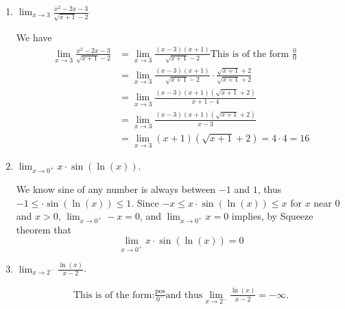 \documentclass[nooutcomes, handout]{ximera}
\begin{document}
\begin{problem}
	\begin{enumerate}
  \item
      $\displaystyle \lim_{x \to 3} \frac{x^2 - 2x - 3}{\sqrt{x+1} - 2}$
      \begin{freeResponse}
        We have
        \begin{align*}
          \lim_{x \to 3} \frac{x^2 - 2x - 3}{\sqrt{x+1} - 2} &= \lim_{x \to 3} \frac{(x- 3)(x + 1)}{\sqrt{x+1} - 2} \text{This is of the form $\frac{0}{0}$} \\
          &= \lim_{x \to 3} \frac{(x- 3)(x + 1)}{\sqrt{x+1} - 2} \cdot \frac{\sqrt{x+1} + 2}{\sqrt{x+1} + 2}\\
          &= \lim_{x \to 3} \frac{(x- 3)(x + 1)(\sqrt{x+1} + 2)}{x+1 - 4}\\
          &= \lim_{x \to 3} \frac{(x- 3)(x + 1)(\sqrt{x+1} + 2)}{x-3}\\
          &= \lim_{x \to 3} (x + 1)(\sqrt{x+1} + 2) = 4 \cdot 4 = 16
        \end{align*}
      \end{freeResponse}


    \item
      $\displaystyle \lim_{x \to 0^+} x \cdot \sin(\ln(x))$.
      \begin{freeResponse}
	We know sine of any number is always between $-1$ and $1$, thus $-1 \le  \cdot \sin(\ln(x)) \le 1$.
        Since $-x \le x \cdot \sin(\ln(x)) \le x$ for $x$ near $0$ and $x>0$, $\lim_{x \to 0^+} -x = 0$, and $\lim_{x \to 0^+} x = 0$ implies, by Squeeze theorem that
        \[
          \lim_{x \to 0^+} x \cdot \sin(\ln(x)) = 0
        \]
      \end{freeResponse}


    \item
      $\displaystyle \lim_{x \to 2^-} \frac{\ln(x)}{x - 2}$.
      \begin{freeResponse}
       
        \begin{align*}
        	\text{This is of the form:}\frac{\text{pos}}{0^-} \text{and thus} \lim_{x \to 2^-} \frac{\ln(x)}{x - 2} = -\infty.
        \end{align*}
      \end{freeResponse}
  \end{enumerate} 
\end{problem}
\end{document}
